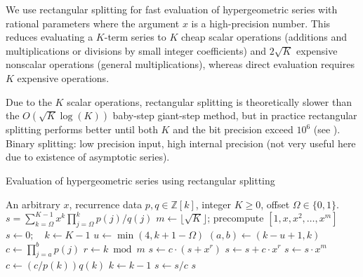 \documentclass[11pt,a4paper]{article}
\begin{document}
\label{sec:serieseval}

We use rectangular splitting for fast evaluation of
hypergeometric series with
rational parameters where the argument $x$ is a high-precision number.
This reduces evaluating a $K$-term series to
$K$ cheap scalar operations (additions and multiplications or divisions
by small integer coefficients)
and $2\sqrt{K}$ expensive nonscalar operations (general multiplications),
whereas direct evaluation requires $K$ expensive operations.

Due to the $K$ scalar operations,
rectangular splitting is theoretically slower
than the $O(\sqrt{K} \log(K))$ baby-step giant-step method,
but in practice rectangular splitting
performs better until both $K$ and the bit precision
exceed $10^6$ (see \cite{Johansson2014rectangular}).
Binary splitting: low precision input, high internal precision
(not very useful here due to existence of asymptotic series).

\begin{algorithm}[h!]
  \caption{Evaluation of hypergeometric series using rectangular splitting}
  \small
  \label{alg:hyprs}
  \begin{algorithmic}[1]
    \Require An arbitrary $x$, recurrence data $p, q \in \mathbb{Z}[k]$, integer $K \ge 0$, offset $\Omega \in \{0,1\}$.
    \Ensure $s = \sum_{k=\Omega}^{K-1} x^k \prod_{j=\Omega}^k p(j) / q(j)$
    \State $m \gets \lfloor \sqrt K \rfloor$; precompute $[1, x, x^2, \ldots, x^m]$ 
    \State $s \gets 0; \quad k \gets K - 1$
        \State $u \gets \min(4, k + 1 - \Omega)$  
        \State $(a, b) \gets (k - u + 1, k)$  
        \State $c \gets \prod_{j=a}^b p(j)$ 
            \State $r \gets k \bmod m$
                \State $s \gets c \cdot (s + x^r)$ 
            \Else
                \State $s \gets s + c \cdot x^r$ 
            \EndIf
                \State $s \gets s \cdot x^m$ 
            \EndIf
            \State $c \gets (c / p(k)) q(k)$ 
            \State $k \gets k - 1$
        \EndWhile
        \State $s \gets s / c$
    \EndWhile
    \State \Return $s$
  \end{algorithmic}
\end{algorithm}
\end{document}
